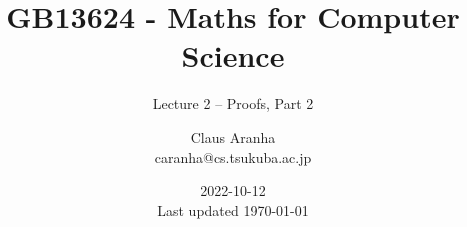 \documentclass[aspectratio=169]{beamer}
\title[GB13624]{GB13624 - Maths for Computer Science}
\subtitle[]{Lecture 2 -- Proofs, Part 2}
\author[Claus Aranha]{Claus Aranha\\{\footnotesize caranha@cs.tsukuba.ac.jp}}
\institute[COINS]{College of Information Science}
\date[2022-10-12]{2022-10-12\\{\tiny Last updated \today}}
\begin{document}


\begin{frame}
  \maketitle
\end{frame}







\end{document}
